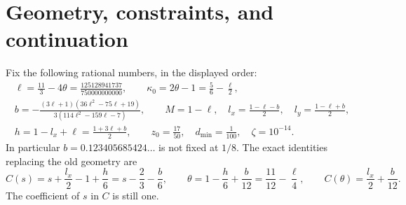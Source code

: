 \documentclass[12pt]{article}
\begin{document}
\section{Geometry, constraints, and continuation}\label{sec:setup}
Fix the following rational numbers, in the displayed order:
\begin{equation}\label{eq:new-geometry}
\begin{gathered}
 \ell=\frac{11}{3}-4\theta=\frac{125128941737}{750000000000},
 \qquad \kappa_0=2\theta-1=\frac56-\frac{\ell}{2},\\
 b=-\frac{(3\ell+1)(36\ell^2-75\ell+19)}
                {3(114\ell^2-159\ell-7)},\qquad
 M=1-\ell,\quad l_x=\frac{1-\ell-b}{2},\quad
 l_y=\frac{1-\ell+b}{2},\\
 h=1-l_x+\ell=\frac{1+3\ell+b}{2},\qquad
 z_0=\frac{17}{50},\quad d_{\min}=\frac1{100},
 \quad\zeta=10^{-14}.
\end{gathered}
\end{equation}
In particular \(b=0.123405685424\ldots\) is not fixed at \(1/8\).
The exact identities replacing the old geometry are
\begin{equation}\label{eq:geometry}
 C(s)=s+\frac{l_x}{2}-1+\frac h6=s-\frac23-\frac b6,
 \qquad
 \theta=1-\frac h6+\frac b{12}=\frac{11}{12}-\frac\ell4,
 \qquad C(\theta)=\frac{l_x}{2}+\frac b{12}.
\end{equation}
The coefficient of \(s\) in \(C\) is still one.
\end{document}
